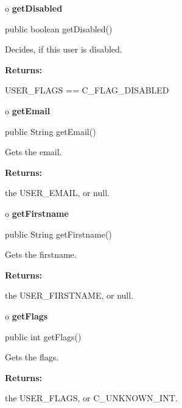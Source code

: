 o {\bf getDisabled} 

\begin{PRE}
 public boolean getDisabled()
\end{PRE}

\begin{description}
\htmlDD Decides, if this user is disabled. 

\begin{description}
\item {\bf Returns:}  

USER\_FLAGS == C\_FLAG\_DISABLED  
\end{description}

\end{description}

o {\bf getEmail} 

\begin{PRE}
 public String getEmail()
\end{PRE}

\begin{description}
\htmlDD Gets the email. 

\begin{description}
\item {\bf Returns:}  

the USER\_EMAIL, or null.  
\end{description}

\end{description}

o {\bf getFirstname} 

\begin{PRE}
 public String getFirstname()
\end{PRE}

\begin{description}
\htmlDD Gets the firstname. 

\begin{description}
\item {\bf Returns:}  

the USER\_FIRSTNAME, or null.  
\end{description}

\end{description}

o {\bf getFlags} 

\begin{PRE}
 public int getFlags()
\end{PRE}

\begin{description}
\htmlDD Gets the flags. 

\begin{description}
\item {\bf Returns:}  

the USER\_FLAGS, or C\_UNKNOWN\_INT.  
\end{description}

\end{description}

